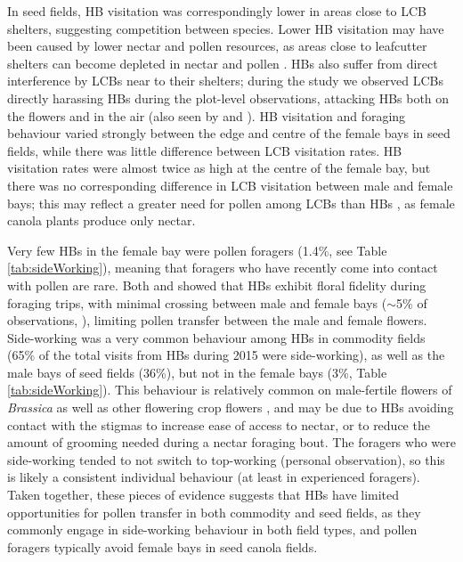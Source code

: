 \documentclass[12pt]{article} %
\begin{document}
In seed fields, HB visitation was correspondingly lower in areas close to LCB shelters, suggesting competition between species.
Lower HB visitation may have been caused by lower nectar and pollen resources, as areas close to leafcutter shelters can become depleted in nectar and pollen \citep{currie1997}.
HBs also suffer from direct interference by LCBs near to their shelters; during the study we observed LCBs directly harassing HBs during the plot-level observations, attacking HBs both on the flowers and in the air (also seen by \citealp{batra1978} and \citealp{waytes2022}). 
HB visitation and foraging behaviour varied strongly between the edge and centre of the female bays in seed fields, while there was little difference between LCB visitation rates.
HB visitation rates were almost twice as high at the centre of the female bay, but there was no corresponding difference in LCB visitation between male and female bays; this may reflect a greater need for pollen among LCBs than HBs \citep{cane2011}, as female canola plants produce only nectar.

Very few HBs in the female bay were pollen foragers (1.4\%, see Table \ref{tab:sideWorking}), meaning that foragers who have recently come into contact with pollen are rare.
Both \citet{waytes2022} and \citet{gaffney2019} showed that HBs exhibit floral fidelity during foraging trips, with minimal crossing between male and female bays ($\sim$5\% of observations, \citealp{waytes2022}), limiting pollen transfer between the male and female flowers.
Side-working was a very common behaviour among HBs in commodity fields (65\% of the total visits from HBs during 2015 were side-working), as well as the male bays of seed fields (36\%), but not in the female bays (3\%, Table \ref{tab:sideWorking}).
This behaviour is relatively common on male-fertile flowers of \textit{Brassica} \citep{free1973,free1983,delbrassine1988,mohr1988} as well as other flowering crop flowers \citep{thomson2001}, and may be due to HBs avoiding contact with the stigmas to increase ease of access to nectar, or to reduce the amount of grooming needed during a nectar foraging bout.
The foragers who were side-working tended to not switch to top-working (personal observation), so this is likely a consistent individual behaviour (at least in experienced foragers).
Taken together, these pieces of evidence suggests that HBs have limited opportunities for pollen transfer in both commodity and seed fields, as they commonly engage in side-working behaviour in both field types, and pollen foragers typically avoid female bays in seed canola fields.
\end{document}
